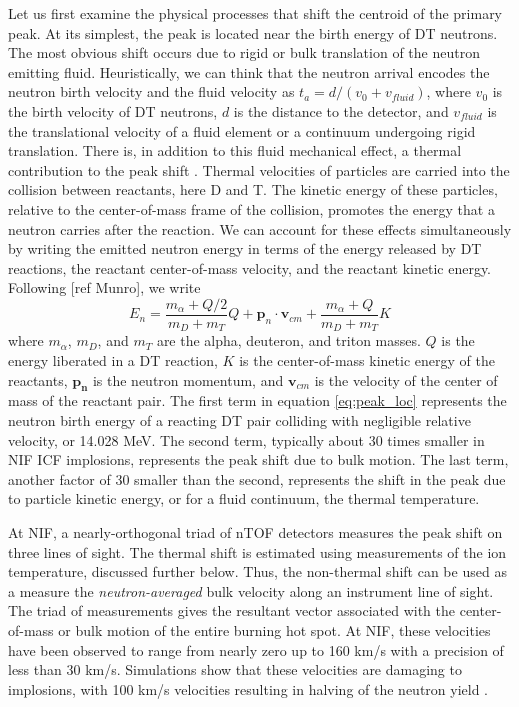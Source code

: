 \documentclass[aip,pop,numerical,reprint,floatfix]{revtex4-1}
\begin{document}
Let us first examine the physical processes that shift the centroid
of the primary peak. At its simplest, the peak is located near the
birth energy of DT neutrons. The most obvious shift occurs due to
rigid or bulk translation of the neutron emitting fluid. Heuristically,
we can think that the neutron arrival encodes the neutron birth velocity
and the fluid velocity as $t_{a}=d/\left(v_{0}+v_{fluid}\right)$,
where $v_{0}$ is the birth velocity of DT neutrons, $d$ is the distance
to the detector, and $v_{fluid}$ is the translational velocity of
a fluid element or a continuum undergoing rigid translation. There
is, in addition to this fluid mechanical effect, a thermal contribution
to the peak shift \cite{ballabio_relativistic_tion_1998}. Thermal
velocities of particles are carried into the collision between reactants,
here D and T. The kinetic energy of these particles, relative to the
center-of-mass frame of the collision, promotes the energy that a
neutron carries after the reaction. We can account for these effects
simultaneously by writing the emitted neutron energy in terms of the
energy released by DT reactions, the reactant center-of-mass velocity,
and the reactant kinetic energy. Following {[}ref Munro{]}, we write
\begin{equation}
E_{n}=\frac{m_{\alpha}+Q/2}{m_{D}+m_{T}}Q+\mathbf{p}_{n}\cdot\mathbf{v}_{cm}+\frac{m_{\alpha}+Q}{m_{D}+m_{T}}K\label{eq:peak_loc}
\end{equation}
where $m_{\alpha}$, $m_{D}$, and $m_{T}$ are the alpha, deuteron,
and triton masses. $Q$ is the energy liberated in a DT reaction,
$K$ is the center-of-mass kinetic energy of the reactants, $\mathbf{p_{n}}$
is the neutron momentum, and $\mathbf{v}_{cm}$ is the velocity of
the center of mass of the reactant pair. The first term in equation \ref{eq:peak_loc}
represents the neutron birth energy of a reacting DT pair colliding
with negligible relative velocity, or 14.028 MeV. The second term,
typically about 30 times smaller in NIF ICF implosions, represents
the peak shift due to bulk motion. The last term, another factor of
30 smaller than the second, represents the shift in the peak due to
particle kinetic energy, or for a fluid continuum, the thermal temperature. 

At NIF, a nearly-orthogonal triad of nTOF detectors measures the peak
shift on three lines of sight. The thermal shift is estimated using
measurements of the ion temperature, discussed further below. Thus,
the non-thermal shift can be used as a measure the \textit{neutron-averaged}
bulk velocity along an instrument line of sight. The triad of measurements
gives the resultant vector associated with the center-of-mass or bulk
motion of the entire burning hot spot. At NIF, these velocities have
been observed to range from nearly zero up to 160 km/s with a precision
of less than 30 km/s. Simulations show that these velocities are damaging
to implosions, with 100 km/s velocities resulting in halving of the
neutron yield \cite{spears_mode1_pop_140409}.
\end{document}
